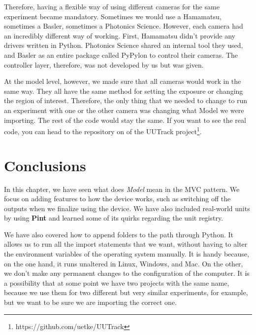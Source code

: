 Therefore, having a flexible way of using different cameras for the same experiment became mandatory. Sometimes we would use a Hamamatsu, sometimes a Basler, sometimes a Photonics Science. However, each camera had an incredibly different way of working. First, Hamamatsu didn't provide any drivers written in Python. Photonics Science shared an internal tool they used, and Basler as an entire package called PyPylon to control their cameras. The controller layer, therefore, was not developed by us but was given.

At the model level, however, we made sure that all cameras would work in the same way. They all have the same method for setting the exposure or changing the region of interest. Therefore, the only thing that we needed to change to run an experiment with one or the other camera was changing what Model we were importing. The rest of the code would stay the same. If you want to see the real code, you can head to the repository on of the UUTrack project\footnote{https://github.com/uetke/UUTrack}.

\section{Conclusions}\label{sec:device-model-conclusions2}
In this chapter, we have seen what does \emph{Model} mean in the {MVC} pattern. We focus on adding features to how the device works, such as switching off the outputs when we finalize using the device. We have also included real-world units by using \textbf{Pint} and learned some of its quirks regarding the unit registry.

We have also covered how to append folders to the path through Python. It allows us to run all the import statements that we want, without having to alter the environment variables of the operating system manually. It is handy because, on the one hand, it runs unaltered in Linux, Windows, and Mac. On the other, we don't make any permanent changes to the configuration of the computer. It is a possibility that at some point we have two projects with the same name, because we use them for two different but very similar experiments, for example, but we want to be sure we are importing the correct one.

